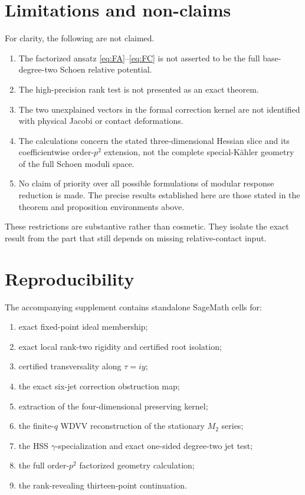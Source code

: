 \documentclass[11pt]{article}
\theoremstyle{definition}
\theoremstyle{remark}
\begin{document}
\section{Limitations and non-claims}

For clarity, the following are not claimed.

\begin{enumerate}[label=\arabic*.]
 \item The factorized ansatz \eqref{eq:FA}--\eqref{eq:FC} is not asserted to be the full base-degree-two Schoen relative potential.
 \item The high-precision rank test is not presented as an exact theorem.
 \item The two unexplained vectors in the formal correction kernel are not identified with physical Jacobi or contact deformations.
 \item The calculations concern the stated three-dimensional Hessian slice and its coefficientwise order-\(p^2\) extension, not the complete special-K\"ahler geometry of the full Schoen moduli space.
 \item No claim of priority over all possible formulations of modular response reduction is made.  The precise results established here are those stated in the theorem and proposition environments above.
\end{enumerate}

These restrictions are substantive rather than cosmetic.  They isolate the exact result from the part that still depends on missing relative-contact input.

\section{Reproducibility}

The accompanying supplement contains standalone SageMath cells for:

\begin{enumerate}[label=\texttt{S\arabic*.}]
 \item exact fixed-point ideal membership;
 \item exact local rank-two rigidity and certified root isolation;
 \item certified transversality along \(\tau=iy\);
 \item the exact six-jet correction obstruction map;
 \item extraction of the four-dimensional preserving kernel;
 \item the finite-\(q\) WDVV reconstruction of the stationary \(M_2\) series;
 \item the HSS \(\gamma\)-specialization and exact one-sided degree-two jet test;
 \item the full order-\(p^2\) factorized geometry calculation;
 \item the rank-revealing thirteen-point continuation.
\end{enumerate}
\end{document}
